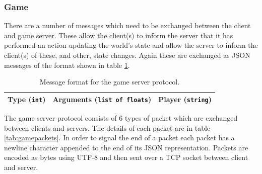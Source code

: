 \documentclass[10pt,twoside,notitlepage,a4paper]{report}
\begin{document}
	\subsubsection{Game}
	There are a number of messages which need to be exchanged between the client and game server. These allow the client(s) to inform the server that it has performed an action updating the world's state and allow the server to inform the client(s) of these, and other, state changes. Again these are exchanged as JSON messages of the format shown in table \ref{tab:gameprotocol}.
	\begin{table}
		\centering
		\begin{tabularx}{0.85\textwidth}{| l | l | X |}
			\hline
			Type (\texttt{int}) & Arguments (\texttt{list of floats}) & Player (\texttt{string})\\
			\hline
		\end{tabularx}
		\caption{Message format for the game server protocol.}
		\label{tab:gameprotocol}
	\end{table}

	The game server protocol consists of $6$ types of packet which are exchanged between clients and servers. The details of each packet are in table \ref{tab:gamepackets}. In order to signal the end of a packet each packet has a newline character appended to the end of its JSON representation. Packets are encoded as bytes using UTF-8 and then sent over a TCP socket between client and server.
\end{document}
